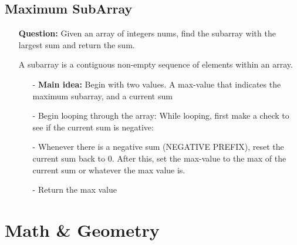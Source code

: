 \documentclass[12pt]{article}
\begin{document}
\subsection{Maximum SubArray}
\begin{enumerate}
  \item[] \textbf{Question:} Given an array of integers nums, find the subarray with the largest sum and return the sum.

A subarray is a contiguous non-empty sequence of elements within an array.

    \begin{enumerate}
      \item[-] \textbf{Main idea:} Begin with two values. A max-value that indicates the maximum subarray, and a current sum
      \item[-] Begin looping through the array: While looping, first make a check to see if the current sum is negative: 
      \item[-] Whenever there is a negative sum (NEGATIVE PREFIX), reset the current sum back to 0. After this, set the max-value to the max of the current sum or whatever the max value is.
      \item[-] Return the max value

    \end{enumerate}
\end{enumerate}



\section{Math {\&} Geometry}
\end{document}
